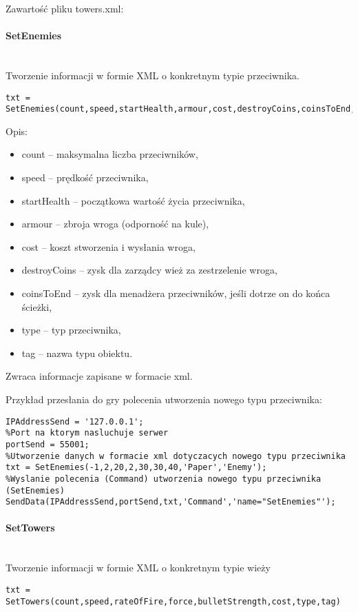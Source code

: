 Zawartość pliku towers.xml:


\paragraph{SetEnemies} \hspace{0pt} \\
Tworzenie informacji w formie XML o konkretnym typie przeciwnika.
\begin{lstlisting}[style=Matlab-editor]
txt = SetEnemies(count,speed,startHealth,armour,cost,destroyCoins,coinsToEnd,type,tag)
\end{lstlisting}

Opis:
\begin{itemize}
\item count -- maksymalna liczba przeciwników,
\item speed -- prędkość przeciwnika,
\item startHealth -- początkowa wartość życia przeciwnika,
\item armour -- zbroja wroga (odporność na kule),
\item cost -- koszt stworzenia i wysłania wroga,
\item destroyCoins -- zysk dla zarządcy wież za zestrzelenie wroga,
\item coinsToEnd -- zysk dla menadżera przeciwników, jeśli dotrze on do końca ścieżki,
\item type -- typ przeciwnika,
\item tag -- nazwa typu obiektu.
\end{itemize}

Zwraca informacje zapisane w formacie xml.

Przykład przesłania do gry polecenia utworzenia nowego typu przeciwnika:
\begin{lstlisting}[style=Matlab-editor]
%Adres serwera
IPAddressSend = '127.0.0.1';
%Port na ktorym nasluchuje serwer
portSend = 55001;
%Utworzenie danych w formacie xml dotyczacych nowego typu przeciwnika
txt = SetEnemies(-1,2,20,2,30,30,40,'Paper','Enemy');
%Wyslanie polecenia (Command) utworzenia nowego typu przeciwnika (SetEnemies)
SendData(IPAddressSend,portSend,txt,'Command','name="SetEnemies"');
\end{lstlisting}

\paragraph{SetTowers} \hspace{0pt} \\
Tworzenie informacji w formie XML o konkretnym typie wieży
\begin{lstlisting}[style=Matlab-editor]
txt = SetTowers(count,speed,rateOfFire,force,bulletStrength,cost,type,tag)
\end{lstlisting}

